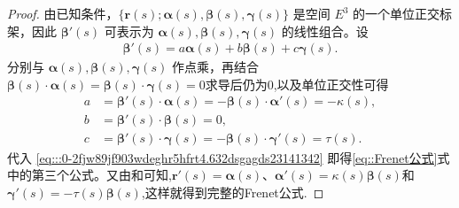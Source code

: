 \documentclass[../../main.tex]{subfiles}%
\begin{document}
\begin{proof}
由已知条件，$\{\bm{r}(s); \bm{\alpha}(s), \bm{\beta}(s), \bm{\gamma}(s)\}$ 是空间 $E^3$ 的一个单位正交标架，因此 $\bm{\beta}'(s)$ 可表示为 $\bm{\alpha}(s), \bm{\beta}(s), \bm{\gamma}(s)$ 的线性组合。设
\begin{align}
\bm{\beta}'(s) = a \bm{\alpha}(s) + b \bm{\beta}(s) + c \bm{\gamma}(s). \label{eq:::0-2fjw89jf903wdeghr5hfrt4.632dsgagds23141342}
\end{align}
分别与 $\bm{\alpha}(s), \bm{\beta}(s), \bm{\gamma}(s)$ 作点乘，再结合$\bm{\beta}(s)\cdot\bm{\alpha}(s)=\bm{\beta}(s)\cdot \bm{\gamma}(s)=0$求导后仍为0,以及单位正交性可得
\begin{align*}
a &= \bm{\beta}'(s)\cdot\bm{\alpha}(s) = -\bm{\beta}(s)\cdot\bm{\alpha}'(s) = -\kappa(s), \\
b &= \bm{\beta}'(s)\cdot\bm{\beta}(s) = 0, \\
c &= \bm{\beta}'(s)\cdot\bm{\gamma}(s) = -\bm{\beta}(s)\cdot\bm{\gamma}'(s) = \tau(s).
\end{align*}
代入 \eqref{eq:::0-2fjw89jf903wdeghr5hfrt4.632dsgagds23141342} 即得\eqref{eq::Frenet公式}式中的第三个公式。又由和可知,$\bm{r}'(s)=\bm{\alpha}(s)$、$\bm{\alpha}'(s)=\kappa(s)\bm{\beta}(s)$和$\bm{\gamma}'(s)=-\tau(s)\bm{\beta}(s)$,这样就得到完整的Frenet公式.
\end{proof}
\end{document}
